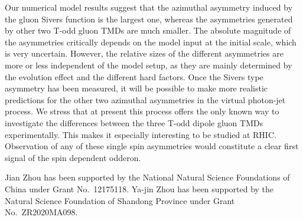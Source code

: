 \documentclass[prd,aps,preprintnumbers,fleqn,showpacs,nofootinbib,superscriptaddress]{revtex4}
\begin{document}
 Our numerical model results suggest that the azimuthal asymmetry induced by the gluon Sivers function is the largest one, whereas the asymmetries generated by other two T-odd gluon TMDs are much smaller. The absolute magnitude of the asymmetries critically depends on the model input at the initial scale, which is very uncertain. However, the relative sizes of the different asymmetries are more or less independent of the model setup, as they are mainly determined by the evolution effect and the different hard factors. Once the Sivers type asymmetry has been measured, it will be possible to make more realistic predictions for the other two azimuthal asymmetries in the virtual photon-jet process. We stress that at present this process offers the only known way to investigate the differences between the three T-odd dipole gluon TMDs experimentally. This makes it especially interesting to be studied at RHIC. Observation of any of these single spin asymmetries would constitute a clear first signal of the spin dependent odderon.

\begin{acknowledgments}
Jian Zhou has been supported by the National Natural Science Foundations of China under Grant No.\ 12175118. Ya-jin Zhou has been supported by  the  Natural Science Foundation of Shandong Province under Grant No.\ ZR2020MA098. 
\end{acknowledgments}


\end{document}
